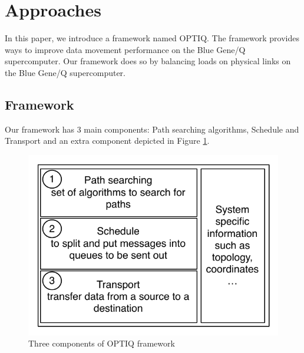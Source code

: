 \section{Approaches}
\label{sec:approach}

In this paper, we introduce a framework named OPTIQ. The framework provides ways to improve data movement performance on the Blue Gene/Q supercomputer. Our framework does so by balancing loads on physical links on the Blue Gene/Q supercomputer.

\subsection{Framework}

Our framework has 3 main components: Path searching algorithms, Schedule and Transport and an extra component depicted in Figure \ref{fig:framework}.

\begin{figure}[!htb]
\vspace{-0.1in}
\centering
\includegraphics[scale=0.7]{figures/framework.pdf}
\vspace{-0.2in}
\caption{Three components of OPTIQ framework}
\vspace{-0.1in}
\label{fig:framework}
\end{figure}

